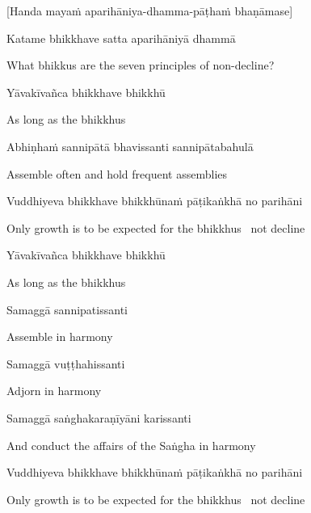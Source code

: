 \begin{center}
  [Handa mayaṁ aparihāniya-dhamma-pāṭhaṁ bhaṇāmase]
\end{center}

Katame bhikkhave satta aparihāniyā dhammā

\begin{english}
  What bhikkus are the seven principles of non-decline?
\end{english}

Yāvakīvañca bhikkhave bhikkhū

\begin{english}
  As long as the bhikkhus
\end{english}

Abhiṇhaṁ sannipātā bhavissanti sannipātabahulā

\begin{english}
  Assemble often and hold frequent assemblies
\end{english}

Vuddhiyeva bhikkhave bhikkhūnaṁ pāṭikaṅkhā no parihāni

\begin{english}
  Only growth is to be expected for the bhikkhus \breathmark\ not decline
\end{english}

Yāvakīvañca bhikkhave bhikkhū

\begin{english}
  As long as the bhikkhus
\end{english}

Samaggā sannipatissanti

\begin{english}
  Assemble in harmony
\end{english}

Samaggā vuṭṭhahissanti

\begin{english}
  Adjorn in harmony
\end{english}

Samaggā saṅghakaraṇīyāni karissanti

\begin{english}
  And conduct the affairs of the Saṅgha in harmony
\end{english}

Vuddhiyeva bhikkhave bhikkhūnaṁ pāṭikaṅkhā no parihāni

\begin{english}
  Only growth is to be expected for the bhikkhus \breathmark\ not decline
\end{english}

